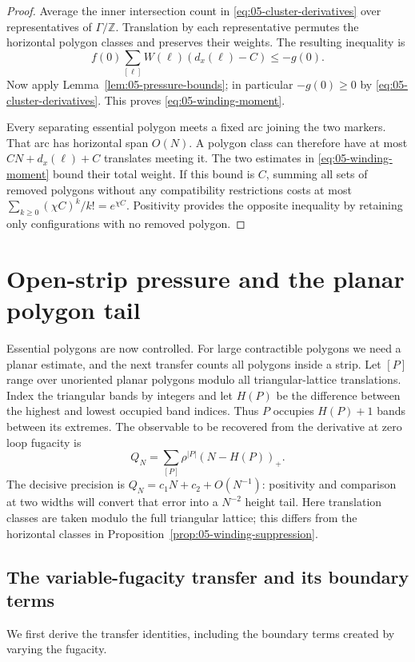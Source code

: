 \begin{proof}
Average the inner intersection count in \eqref{eq:05-cluster-derivatives} over representatives of \(\Gamma/\mathbb Z\). Translation by each representative permutes the horizontal polygon classes and preserves their weights. The resulting inequality is
\[
 f(0)\sum_{[\ell]}W(\ell)(d_x(\ell)-C)\le-g(0).
\]
Now apply Lemma~\ref{lem:05-pressure-bounds}; in particular \(-g(0)\ge0\) by \eqref{eq:05-cluster-derivatives}. This proves \eqref{eq:05-winding-moment}.

Every separating essential polygon meets a fixed arc joining the two markers. That arc has horizontal span \(O(N)\). A polygon class can therefore have at most \(CN+d_x(\ell)+C\) translates meeting it. The two estimates in \eqref{eq:05-winding-moment} bound their total weight. If this bound is \(C\), summing all sets of removed polygons without any compatibility restrictions costs at most \(\sum_{k\ge0}(\chi C)^k/k!=e^{\chi C}\). Positivity provides the opposite inequality by retaining only configurations with no removed polygon.
\end{proof}

\section{Open-strip pressure and the planar polygon tail}
\label{sec:05-open-pressure}

Essential polygons are now controlled. For large contractible polygons
we need a planar estimate, and the next transfer counts all polygons
inside a strip. Let \([P]\) range over unoriented planar polygons modulo all
triangular-lattice translations. Index the triangular bands by integers
and let \(H(P)\) be the difference between the highest and lowest
occupied band indices. Thus \(P\) occupies \(H(P)+1\) bands between
its extremes. The observable to be recovered from the derivative at
zero loop fugacity is
\[
 Q_N=\sum_{[P]}\rho^{|P|}(N-H(P))_+.
\]
The decisive precision is
\(Q_N=c_1N+c_2+O(N^{-1})\): positivity and comparison at two widths
will convert that error into a
\(N^{-2}\) height tail. Here translation classes are taken modulo the
full triangular lattice; this differs from the horizontal classes in
Proposition~\ref{prop:05-winding-suppression}.

\subsection{The variable-fugacity transfer and its boundary terms}

We first derive the transfer identities, including the boundary terms
created by varying the fugacity.

